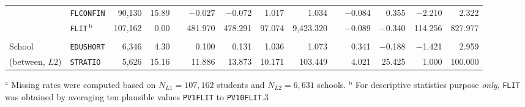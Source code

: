 {\begin{tabular}{llrr c@{\hskip 7.5mm} rrrr c@{\hskip 7.5mm} rrrr}
    & \texttt{FLCONFIN} & 90,130 & 15.89 &       & $-$0.027 & $-$0.072 & 1.017 & 1.034 &       & $-$0.084 & 0.355 & $-$2.210 & 2.322 \\
    & \texttt{FLIT}$\, ^\text{b}$  & 107,162 & 0.00  &       & 481.970 & 478.291 & 97.074 & 9,423.320 &       & $-$0.089 & $-$0.340 & 114.256 & 827.977 \\
    &       &       &       &       &       &       &       &       &       &       &       &       &  \\
    School & \texttt{EDUSHORT} & 6,346  & 4.30  &       & 0.100 & 0.131 & 1.036 & 1.073 &       & 0.341 & $-$0.188 & $-$1.421 & 2.959 \\
    (between, $L2$) & \texttt{STRATIO} & 5,626  & 15.16 &       & 11.886 & 13.873 & 10.171 & 103.449 &       & 4.021 & 25.425 & 1.000 & 100.000 \\
    \bottomrule
    \end{tabular}
}{$^\text{a}$ Missing rates were computed based on $N_{L1} = 107,162$ students and $N_{L2} = 6,631$ schools. $^\text{b}$ For descriptive statistics purpose \emph{only}, \texttt{FLIT} was obtained by averaging ten plausible values \texttt{PV1FLIT} to \texttt{PV10FLIT}.}{3}

